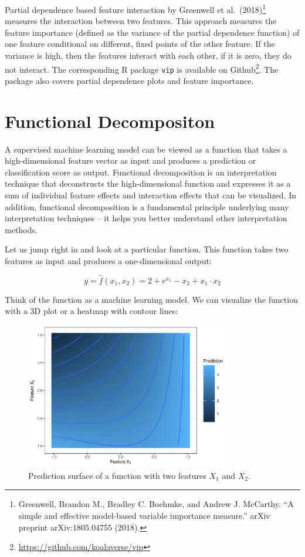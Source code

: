 \documentclass[
  11pt,
]{scrbook}
\renewcommand{\href}[2]{#2\footnote{\url{#1}}}
\begin{document}
Partial dependence based feature interaction by Greenwell et al.~(2018)\footnote{Greenwell, Brandon M., Bradley C. Boehmke, and Andrew J. McCarthy. ``A simple and effective model-based variable importance measure.'' arXiv preprint arXiv:1805.04755 (2018).} measures the interaction between two features.
This approach measures the feature importance (defined as the variance of the partial dependence function) of one feature conditional on different, fixed points of the other feature.
If the variance is high, then the features interact with each other, if it is zero, they do not interact.
The corresponding R package \texttt{vip} is available on \href{https://github.com/koalaverse/vip}{Github}.
The package also covers partial dependence plots and feature importance.

\hypertarget{decomposition}{%
\section{Functional Decompositon}\label{decomposition}}

A supervised machine learning model can be viewed as a function that takes a high-dimensional feature vector as input and produces a prediction or classification score as output.
Functional decomposition is an interpretation technique that deconstructs the high-dimensional function and expresses it as a sum of individual feature effects and interaction effects that can be visualized.
In addition, functional decomposition is a fundamental principle underlying many interpretation techniques -- it helps you better understand other interpretation methods.

Let us jump right in and look at a particular function.
This function takes two features as input and produces a one-dimensional output:

\[y = \hat{f}(x_1, x_2) = 2 + e^{x_1} - x_2 + x_1 \cdot x_2\]

Think of the function as a machine learning model.
We can visualize the function with a 3D plot or a heatmap with contour lines:

\begin{figure}

{\centering \includegraphics[width=0.8\textwidth]{images/unnamed-chunk-16-1} 

}

\caption{Prediction surface of a function with two features $X_1$ and $X_2$.}\label{fig:unnamed-chunk-16}
\end{figure}
\end{document}
